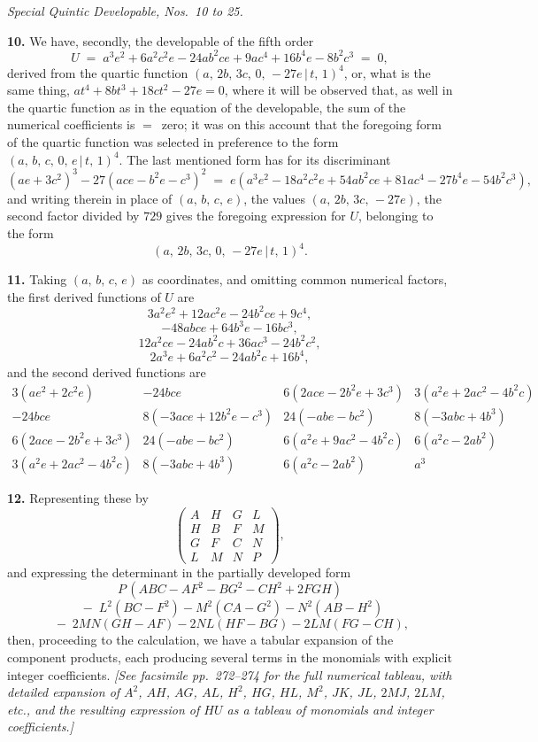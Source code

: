 \documentclass[11pt,a4paper]{article}
\providecommand{\mid}{\,|\,}
\begin{document}
\bigskip

\begin{center}
\textit{Special Quintic Developable, Nos.\ 10 to 25.}
\end{center}

\textbf{10.} We have, secondly, the developable of the fifth order
\[
U \;=\; a^3 e^2 + 6a^2 c^2 e - 24 ab^2 ce + 9ac^4 + 16b^4 e - 8b^2 c^3 \;=\; 0,
\]
derived from the quartic function $(a,\,2b,\,3c,\,0,\,-27e\mid t,\,1)^4$, or, what is the same thing, $at^4 + 8bt^3 + 18ct^2 - 27e = 0$, where it will be observed that, as well in the quartic function as in the equation of the developable, the sum of the numerical coefficients is $=$~zero; it was on this account that the foregoing form of the quartic function was selected in preference to the form $(a,\,b,\,c,\,0,\,e\mid t,\,1)^4$. The last mentioned form has for its discriminant
\[
(ae + 3c^2)^3 - 27(ace - b^2 e - c^3)^2 \;=\; e(a^3 e^2 - 18a^2 c^2 e + 54 ab^2 ce + 81 ac^4 - 27 b^4 e - 54 b^2 c^3),
\]
and writing therein in place of $(a,\,b,\,c,\,e)$, the values $(a,\,2b,\,3c,\,-27e)$, the second factor divided by $729$ gives the foregoing expression for $U$, belonging to the form
\[
(a,\,2b,\,3c,\,0,\,-27e\mid t,\,1)^4.
\]

\medskip

\textbf{11.} Taking $(a,\,b,\,c,\,e)$ as coordinates, and omitting common numerical factors, the first derived functions of $U$ are
\[
3a^2 e^2 + 12 ac^2 e - 24b^2 ce + 9c^4,
\]
\[
-48 abce + 64 b^3 e - 16 bc^3,
\]
\[
12 a^2 ce - 24 ab^2 c + 36 ac^3 - 24 b^2 c^2,
\]
\[
2a^3 e + 6a^2 c^2 - 24 ab^2 c + 16 b^4,
\]
and the second derived functions are
\[
\begin{array}{cccc}
3(ae^2 + 2c^2 e) & -24 bce & 6(2ace - 2b^2 e + 3c^3) & 3(a^2 e + 2a c^2 - 4b^2 c) \\
-24 bce & 8(-3ace + 12 b^2 e - c^3) & 24(-abe - bc^2) & 8(-3abc + 4b^3) \\
6(2ace - 2b^2 e + 3c^3) & 24(-abe - bc^2) & 6(a^2 e + 9 ac^2 - 4b^2 c) & 6(a^2 c - 2ab^2) \\
3(a^2 e + 2 ac^2 - 4b^2 c) & 8(-3abc + 4b^3) & 6(a^2 c - 2 ab^2) & a^3
\end{array}
\]

\medskip

\textbf{12.} Representing these by
\[
\begin{pmatrix} A & H & G & L \\ H & B & F & M \\ G & F & C & N \\ L & M & N & P \end{pmatrix},
\]
and expressing the determinant in the partially developed form
\[
P\,(ABC - AF^2 - BG^2 - CH^2 + 2FGH)
\]
\[
\;-\; L^2(BC - F^2) - M^2(CA - G^2) - N^2(AB - H^2)
\]
\[
\;-\; 2MN(GH - AF) - 2NL(HF - BG) - 2LM(FG - CH),
\]
then, proceeding to the calculation, we have a tabular expansion of the component products, each producing several terms in the monomials with explicit integer coefficients. \textit{[See facsimile pp.~272--274 for the full numerical tableau, with detailed expansion of $A^2$, $AH$, $AG$, $AL$, $H^2$, $HG$, $HL$, $M^2$, $JK$, $JL$, $2MJ$, $2LM$, etc., and the resulting expression of $H U$ as a tableau of monomials and integer coefficients.]}
\end{document}
